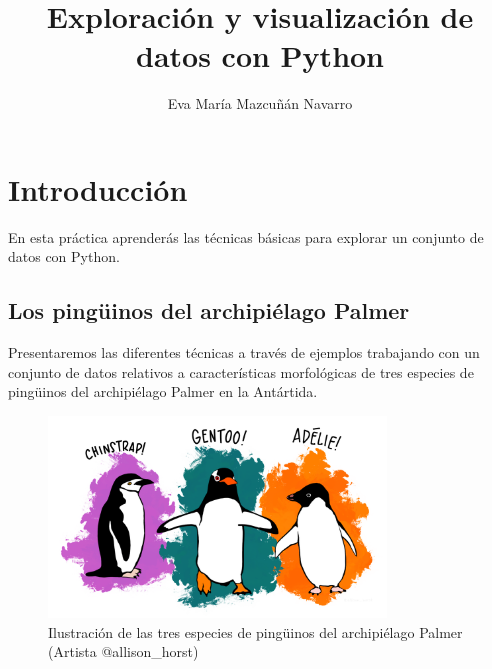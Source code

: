 \documentclass[
  a4paper,
  noprof,
  12pt,
  notoc,
  nosols,
  nobib]{mnye}
\title{Exploración y visualización de datos con Python}
\author{Eva María Mazcuñán Navarro}
\date{}
\renewcommand*\contentsname{Tabla de contenidos}
\newcommand\contentsname{Tabla de contenidos}
\theoremstyle{definition}
\theoremstyle{remark}
\begin{document}
\maketitle
\ifdefined\Shaded\renewenvironment{Shaded}{\begin{tcolorbox}[enhanced, frame hidden, boxrule=0pt, interior hidden, borderline west={3pt}{0pt}{shadecolor}, breakable, sharp corners]}{\end{tcolorbox}}\fi

\renewcommand*\contentsname{Contenidos}
{
\hypersetup{linkcolor=elinkcolor}
%
\pagestyle{plain}%
\setcounter{tocdepth}{2}
\tableofcontents
{}
}




\hypertarget{sec-intro}{%
\section*{Introducción}\label{sec-intro}}


En esta práctica aprenderás las técnicas básicas para explorar un
conjunto de datos con Python.

\hypertarget{los-pinguxfcinos-del-archipiuxe9lago-palmer}{%
\subsection*{Los pingüinos del archipiélago
Palmer}\label{los-pinguxfcinos-del-archipiuxe9lago-palmer}}


Presentaremos las diferentes técnicas a través de ejemplos trabajando
con un conjunto de datos relativos a características morfológicas de
tres especies de pingüinos del archipiélago Palmer en la Antártida.

\begin{figure}[tbph]

{\centering \includegraphics[width=0.8\textwidth,height=\textheight]{chapters/../img/penguins.png}

}

\caption{Ilustración de las tres especies de pingüinos del archipiélago
Palmer (Artista @allison\_horst)}

\end{figure}
\end{document}
